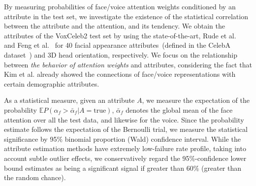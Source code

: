 \documentclass{article}
\begin{document}
By measuring probabilities of face/voice attention weights conditioned by an attribute in the test set, we investigate the existence of the statistical correlation between the attribute and the attention, and its tendency.
We obtain the attributes of the VoxCeleb2 test set by using the state-of-the-art, Rude et al.~\cite{rudd2016moon} and Feng et al.~\cite{feng2018prn} for 40 facial appearance attributes~(defined in the CelebA dataset~\cite{Liu2015}) and 3D head orientation, respectively.
We focus on the relationship between \emph{the behavior of attention weights} and attributes, considering the fact that Kim et al. \cite{kim2018learning} already showed the connections of face/voice representations with certain demographic attributes. 

As a statistical measure, given an attribute $A$, we measure the expectation of the probability $\mathbb{E} P(\alpha_f {>} {\bar \alpha}_f|A{=}\textrm{true})$, ${\bar \alpha}_f$ denotes the global mean of the face attention over all the test data, and likewise for the voice.
Since the probability estimate follows the expectation of the Bernoulli trial, we measure the statistical significance by 95$\%$ binomial proportion (Wald) confidence interval.
While the attribute estimation methods have extremely low-failure rate profile, taking into account subtle outlier effects, we conservatively regard the 95$\%$-confidence lower bound estimates as being a significant signal if greater than 60$\%$ (greater than the random chance).
\end{document}
